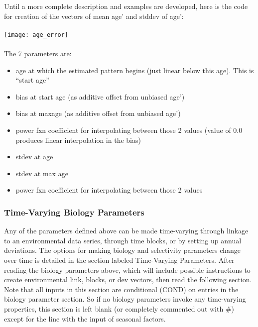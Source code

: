Until a more complete description and examples are developed, here is the code for creation of the vectors of mean age’ and stddev of age’:
\\\\
\texttt{[image: age\_error]}
\\\\
The 7 parameters are:

	\begin{itemize}
		\item age at which the estimated pattern begins (just linear below this age).  This is “start age”
		\item bias at start age (as additive offset from unbiased age’)
		\item bias at maxage (as additive offset from unbiased age’)
		\item power fxn coefficient for interpolating between those 2 values (value of 0.0 produces linear interpolation in the bias)
		\item stdev at age
		\item stdev at max age
		\item power fxn coefficient for interpolating between those 2 values
	\end{itemize}


\subsubsection{Time-Varying Biology Parameters}
Any of the parameters defined above can be made time-varying through linkage to an environmental data series, through time blocks, or by setting up annual deviations.  The options for making biology and selectivity parameters change over time is detailed in the section labeled Time-Varying Parameters.  After reading the biology parameters above, which will include possible instructions to create environmental link, blocks, or dev vectors, then read the following section.  Note that all inputs in this section are conditional (COND) on entries in the biology parameter section.  So if no biology parameters invoke any time-varying properties, this section is left blank (or completely commented out with \#) except for the line with the input of seasonal factors.

